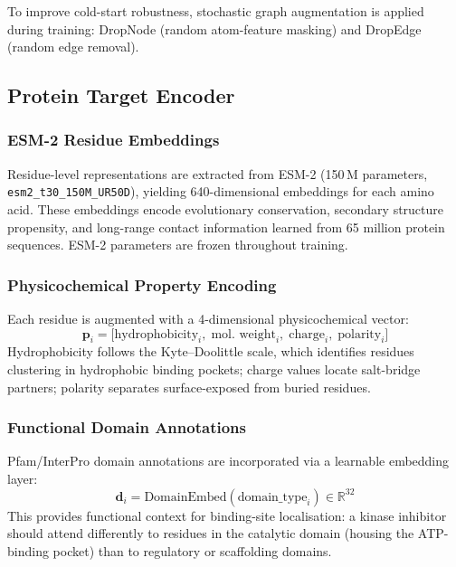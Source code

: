 \documentclass[fleqn,10pt]{wlscirep}
\begin{document}
To improve cold-start robustness, stochastic graph augmentation is applied during
training: DropNode (random atom-feature masking) and DropEdge\cite{rong2020dropedge}
(random edge removal).

\subsection{Protein Target Encoder}

\subsubsection{ESM-2 Residue Embeddings}

Residue-level representations are extracted from ESM-2 (150\,M parameters,
\texttt{esm2\_t30\_150M\_UR50D}),\cite{lin2023evolutionary} yielding
640-dimensional embeddings for each amino acid.  These embeddings encode
evolutionary conservation, secondary structure propensity, and long-range contact
information learned from 65 million protein sequences.  ESM-2 parameters are
frozen throughout training.

\subsubsection{Physicochemical Property Encoding}

Each residue is augmented with a 4-dimensional physicochemical vector:
\begin{equation}
\mathbf{p}_i = \bigl[\text{hydrophobicity}_i,\;\text{mol.\ weight}_i,\;
  \text{charge}_i,\;\text{polarity}_i\bigr]
\end{equation}
Hydrophobicity follows the Kyte--Doolittle scale,\cite{kyte1982simple}
which identifies residues clustering in hydrophobic binding pockets; charge
values locate salt-bridge partners; polarity separates surface-exposed from
buried residues.

\subsubsection{Functional Domain Annotations}

Pfam/InterPro domain annotations are incorporated via a learnable embedding
layer:
\begin{equation}
\mathbf{d}_i = \mathrm{DomainEmbed}(\text{domain\_type}_i) \in \mathbb{R}^{32}
\end{equation}
This provides functional context for binding-site localisation: a kinase inhibitor
should attend differently to residues in the catalytic domain (housing the
ATP-binding pocket) than to regulatory or scaffolding domains.
\end{document}
